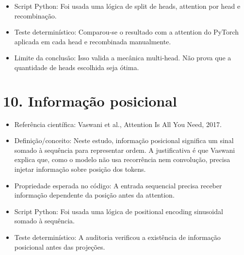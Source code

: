 \begin{itemize}
\item Script Python:
Foi usada uma lógica de split de heads, attention por head e recombinação.
\end{itemize}

\begin{itemize}
\item Teste determinístico:
Comparou-se o resultado com a attention do PyTorch aplicada em cada head e
recombinada manualmente.
\end{itemize}

\begin{itemize}
\item Limite da conclusão:
Isso valida a mecânica multi-head. Não prova que a quantidade de heads
escolhida seja ótima.
\end{itemize}



\section{10. Informação posicional}


\begin{itemize}
\item Referência científica:
Vaswani et al., Attention Is All You Need, 2017.
\end{itemize}

\begin{itemize}
\item Definição/conceito:
Neste estudo, informação posicional significa um sinal somado à sequência para
representar ordem. A justificativa é que Vaswani explica que, como o modelo não
usa recorrência nem convolução, precisa injetar informação sobre posição dos
tokens.
\end{itemize}

\begin{itemize}
\item Propriedade esperada no código:
A entrada sequencial precisa receber informação dependente da posição antes da
attention.
\end{itemize}

\begin{itemize}
\item Script Python:
Foi usada uma lógica de positional encoding sinusoidal somado à sequência.
\end{itemize}

\begin{itemize}
\item Teste determinístico:
A auditoria verificou a existência de informação posicional antes das
projeções.
\end{itemize}

